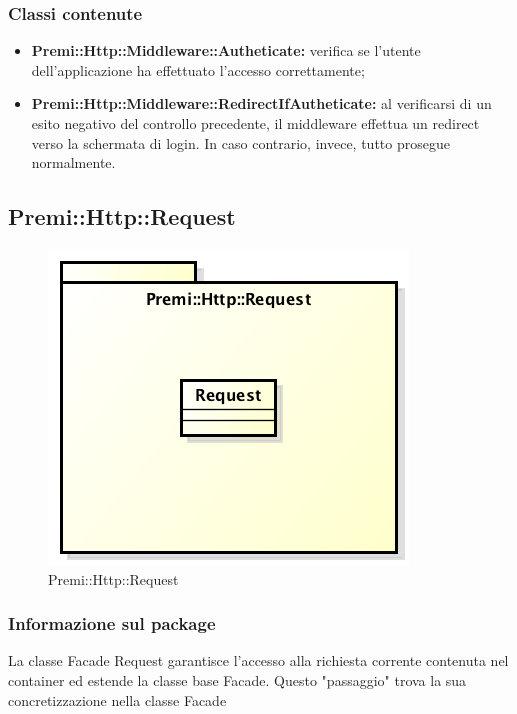 	\subsubsection*{Classi contenute}
		\begin{itemize}
			\item \textbf{Premi::Http::Middleware::Autheticate:} verifica se l'utente dell'applicazione ha effettuato l'accesso correttamente;
			\item \textbf{Premi::Http::Middleware::RedirectIfAutheticate:} al verificarsi di un esito negativo del controllo precedente, il middleware effettua un redirect verso la schermata di login. In caso contrario, invece, tutto prosegue normalmente.
		\end{itemize}
\newpage
\subsection{Premi::Http::Request}
\begin{figure}[h]
\centering
\includegraphics[width=0.6\linewidth]{img/premi_http_request}
\caption[Premi::Http::Request]{Premi::Http::Request}
\label{fig:premi_http_request}
\end{figure}
	\subsubsection*{Informazione sul package}
	La classe Facade Request garantisce l'accesso alla richiesta corrente contenuta nel container ed estende la classe base Facade. Questo "passaggio" trova la sua concretizzazione nella classe Facade

